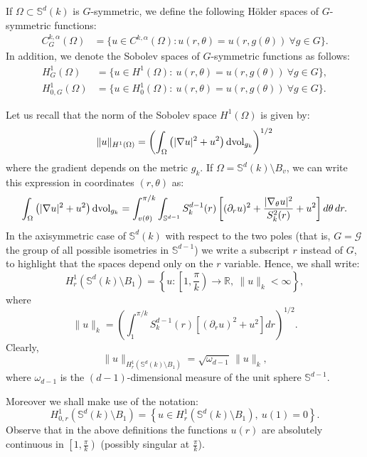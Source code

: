 \documentclass[reqno]{amsart}
\def\S{\mathbb S}
\def\R{\mathbb R}
\def\Sk{\mathbb{S}^{d}(k)}
\numberwithin{equation}{section}
\newenvironment{key words}{\textbf{Keywords}\mbox{  }}{ }
\begin{document}
\medskip

If $\Omega\subset\mathbb{S}^{d}(k)$ is $G$-symmetric, we define the following H\"{o}lder spaces of $G$-symmetric functions:
\begin{align*}
C^{k,\alpha}_{G}(\Omega)&=\{u\in C^{k,\alpha}(\Omega):u(r, \theta)=u(r, g(\theta)) \ \forall g\in G\}.
\end{align*}
In addition, we denote the Sobolev spaces of $G$-symmetric functions as follows:
\begin{align*}
  H^{1}_{G}(\Omega)&=\{u\in H^{1}(\Omega): \ u(r, \theta)=u(r, g(\theta)) \ \forall g\in G\}, \\
   H^{1}_{0,G}(\Omega)&=\{u\in H^{1}_{0}(\Omega):\ u(r, \theta)=u(r, g(\theta)) \ \forall g\in G\}.
\end{align*}

\medskip


Let us recall that the norm of the Sobolev space $H^1(\Omega)$ is given by:
$$ \| u \|_{H^1(\Omega)} = \left (\int_{\Omega}\left(|\nabla u|^{2}+u^{2}\right) \textnormal{dvol}_{g_{k}}\right )^{1/2}$$
where the gradient depends on the metric $g_k$.
If $\Omega = \Sk \setminus B_v$, we can write this expression in coordinates $(r, \theta)$ as:
$$ \int_{\Omega}\left(|\nabla u|^{2}+u^{2}\right) \textnormal{dvol}_{g_k}=\int_{v(\theta)}^{\pi/k} \int_{\mathbb{S}^{d-1}} S^{d-1}_{k}(r)\left[(\partial_{r} u)^{2}+\frac{|\nabla_{\theta}u|^{2}}{S^2_{k}(r)}+u^{2}\right] d\theta \, d r.$$
In the axisymmetric case of $ \Sk$ with respect to the two poles (that is, $G= \mathcal{G}$ the group of all possible isometries in $\S^{d-1}$) we write a subscript $r$ instead of $G$, to highlight that the spaces depend only on the $r$ variable. Hence, we shall write:
$$H_{r}^1(\Sk \setminus B_1) = \left \{u: \left[1, \frac{\pi}{k}\right)\to \R, \ \| u \|_k < \infty \right \},$$
where
\begin{equation} \label{radialnorm} \| u \|_k = \left ( \int_{1}^{\pi/k} S^{d-1}_{k}(r) \left[(\partial_{r} u)^{2}+ u^{2}\right] dr \right )^{1/2}. \end{equation}
Clearly,
$$ \| u \|_{H^1_{r}(\Sk \setminus B_1)}=  \sqrt{\omega_{d-1}}\, \|u \|_k,$$
where $\omega_{d-1}$ is the $(d-1)$-dimensional measure of the unit sphere $\mathbb{S}^{d-1}$.

\medskip

Moreover we shall make use of the notation:
$$H_{0,r}^1(\Sk \setminus B_1) = \left \{u \in H_{r}^1(\Sk \setminus B_1), \ u(1)=0 \right \}.$$
Observe that in the above definitions the functions $u(r)$ are absolutely continuous in $\left[1, \frac{\pi}{k}\right)$ (possibly singular at $\frac{\pi}{k}$).
\end{document}
